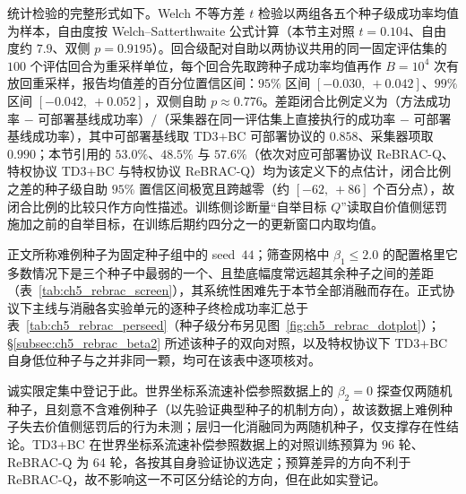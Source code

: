 统计检验的完整形式如下。Welch 不等方差 $t$ 检验以两组各五个种子级成功率均值为样本，自由度按 Welch--Satterthwaite 公式计算（本节主对照 $t = 0.104$、自由度约 $7.9$、双侧 $p = 0.9195$）。回合级配对自助以两协议共用的同一固定评估集的 $100$ 个评估回合为重采样单位，每个回合先取跨种子成功率均值再作 $B = 10^4$ 次有放回重采样，报告均值差的百分位置信区间：$95\%$ 区间 $[-0.030,\ +0.042]$、$99\%$ 区间 $[-0.042,\ +0.052]$，双侧自助 $p \approx 0.776$。差距闭合比例定义为（方法成功率 $-$ 可部署基线成功率）$/$（采集器在同一评估集上直接执行的成功率 $-$ 可部署基线成功率），其中可部署基线取 TD3+BC 可部署协议的 $0.858$、采集器项取 $0.990$；本节引用的 $53.0\%$、$48.5\%$ 与 $57.6\%$（依次对应可部署协议 ReBRAC-Q、特权协议 TD3+BC 与特权协议 ReBRAC-Q）均为该定义下的点估计，闭合比例之差的种子级自助 $95\%$ 置信区间极宽且跨越零（约 $[-62,\ +86]$ 个百分点），故闭合比例的比较只作方向性描述。训练侧诊断量“自举目标 $Q$”读取自价值侧惩罚施加之前的自举目标，在训练后期约四分之一的更新窗口内取均值。

正文所称难例种子为固定种子组中的 seed~$44$；筛查网格中 $\beta_1 \le 2.0$ 的配置格里它多数情况下是三个种子中最弱的一个、且垫底幅度常远超其余种子之间的差距（表~\ref{tab:ch5_rebrac_screen}），其系统性困难先于本节全部消融而存在。正式协议下主线与消融各实验单元的逐种子终检成功率汇总于表~\ref{tab:ch5_rebrac_perseed}（种子级分布另见图~\ref{fig:ch5_rebrac_dotplot}）；\S\ref{subsec:ch5_rebrac_beta2} 所述该种子的双向对照，以及特权协议下 TD3+BC 自身低位种子与之并非同一颗，均可在该表中逐项核对。

诚实限定集中登记于此。世界坐标系流速补偿参照数据上的 $\beta_2 = 0$ 探查仅两随机种子，且刻意不含难例种子（以先验证典型种子的机制方向），故该数据上难例种子失去价值侧惩罚后的行为未测；层归一化消融同为两随机种子，仅支撑存在性结论。TD3+BC 在世界坐标系流速补偿参照数据上的对照训练预算为 $96$ 轮、ReBRAC-Q 为 $64$ 轮，各按其自身验证协议选定；预算差异的方向不利于 ReBRAC-Q，故不影响这一不可区分结论的方向，但在此如实登记。

